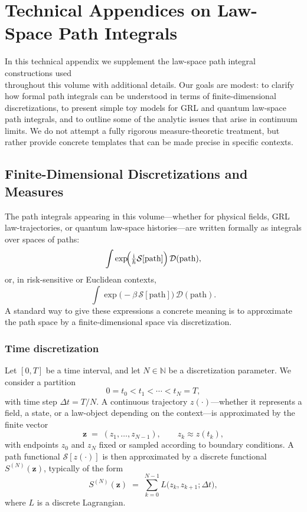 \documentclass[11pt]{book}
\theoremstyle{plain}
\theoremstyle{definition}
\theoremstyle{remark}
\begin{document}
\appendix

\chapter{Technical Appendices on Law-Space Path Integrals}
\label{chap:tech-appendix-lawspace-pi}


In this technical appendix we supplement the law-space path integral
constructions used \\throughout this volume with additional details.
Our goals are modest: to clarify how formal path integrals can be
understood in terms of finite-dimensional discretizations, to
present simple toy models for GRL and quantum law-space path
integrals, and to outline some of the analytic issues that arise in
continuum limits. We do not attempt a fully rigorous measure-theoretic
treatment, but rather provide concrete templates that can be made
precise in specific contexts.

\section{Finite-Dimensional Discretizations and Measures}
\label{sec:finite-dim-discretizations}


The path integrals appearing in this volume—whether for physical
fields, GRL law-trajectories, or quantum law-space histories—are
written formally as integrals over spaces of paths:
\[
   \int \exp\!\Bigl(\tfrac{\mathrm{i}}{\hbar}
   \mathcal{S}[\text{path}]\Bigr)\,\mathcal{D}(\text{path}),
\]
or, in risk-sensitive or Euclidean contexts,
\[
   \int \exp\!\bigl(-\beta\,\mathcal{S}[\text{path}]\bigr)\,
   \mathcal{D}(\text{path}).
\]
A standard way to give these expressions a concrete meaning is to
approximate the path space by a finite-dimensional space via
discretization.

\subsection*{Time discretization}

Let $[0,T]$ be a time interval, and let $N\in\mathbb{N}$ be a
discretization parameter. We consider a partition
\[
   0 = t_0 < t_1 < \cdots < t_N = T,
\]
with time step $\Delta t = T/N$. A continuous trajectory
$z(\cdot)$—whether it represents a field, a state, or a law-object
depending on the context—is approximated by the finite vector
\[
   \mathbf{z}
   \;=\;
   (z_1,\dots,z_{N-1}),
   \qquad
   z_k \approx z(t_k),
\]
with endpoints $z_0$ and $z_N$ fixed or sampled according to
boundary conditions. A path functional $\mathcal{S}[z(\cdot)]$ is
then approximated by a discrete functional $S^{(N)}(\mathbf{z})$,
typically of the form
\[
   S^{(N)}(\mathbf{z})
   \;=\;
   \sum_{k=0}^{N-1}
   L\bigl(z_k,z_{k+1};\Delta t\bigr),
\]
where $L$ is a discrete Lagrangian.
\end{document}
